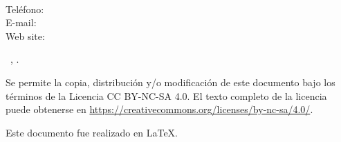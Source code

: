 \thispagestyle{empty}
\makeatletter
\parindent=0mm 

\vspace*{9cm}

\textbf{{\@author}}

\vspace*{0.5cm}


\noindent
\begin{minipage}[t]{.5\textwidth}
\raggedright
{\@schoolCR}\\
{\@schoolBuildingCR}\\
{\@schoolAddressCR}\\
\end{minipage}%
\begin{minipage}[t]{.5\textwidth}
\raggedright
{\@schoolAB}\\
{\@schoolBuildingAB}\\
{\@schoolAddressAB}\\
\end{minipage}



\vspace*{0.5cm}

Teléfono:~~~{\@authorPhone}\\
E-mail:~~~~~{\@authorEmail}\\
Web site:~~~{\@authorWeb}

\vspace*{0.75cm}

\textcopyleft~{\@author}, {\@yearTF}.

\begin{changemargin}{0.2cm}{3cm} 
{\footnotesize Se permite la copia, distribución y/o modificación de este documento bajo los términos de la Licencia CC BY-NC-SA 4.0. El texto completo de la licencia puede obtenerse en \url{https://creativecommons.org/licenses/by-nc-sa/4.0/}.}
\end{changemargin} 

{\footnotesize Este documento fue realizado en \LaTeX.}
\makeatother